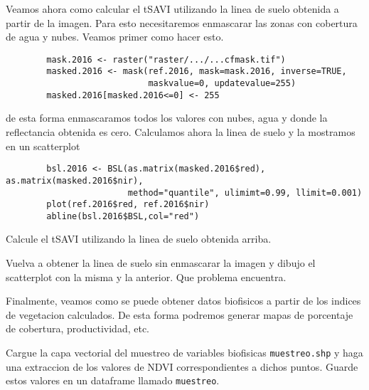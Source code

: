 \documentclass[a4paper]{article}
\begin{document}
\begin{exa}
    Veamos ahora como calcular el tSAVI utilizando la linea de suelo obtenida a
    partir de la imagen. Para esto necesitaremos enmascarar las zonas con
    cobertura de agua y nubes. Veamos primer como hacer esto.
    \begin{lstlisting}
        mask.2016 <- raster("raster/.../...cfmask.tif")
        masked.2016 <- mask(ref.2016, mask=mask.2016, inverse=TRUE,
                            maskvalue=0, updatevalue=255)
        masked.2016[masked.2016<=0] <- 255
    \end{lstlisting}
    de esta forma enmascaramos todos los valores con nubes, agua y donde la
    reflectancia obtenida es cero.
    Calculamos ahora la linea de suelo y la mostramos en un scatterplot
    \begin{lstlisting}
        bsl.2016 <- BSL(as.matrix(masked.2016$red), as.matrix(masked.2016$nir),
                        method="quantile", ulimimt=0.99, llimit=0.001)
        plot(ref.2016$red, ref.2016$nir)
        abline(bsl.2016$BSL,col="red")
    \end{lstlisting}
\end{exa}

\begin{act}
    Calcule el tSAVI utilizando la linea de suelo obtenida arriba.
\end{act}

\begin{act}
    Vuelva a obtener la linea de suelo sin enmascarar la imagen y dibujo el
    scatterplot con la misma y la anterior. Que problema encuentra.
\end{act}

Finalmente, veamos como se puede obtener datos biofisicos a partir de los
indices de vegetacion calculados. De esta forma podremos generar mapas de
porcentaje de cobertura, productividad, etc.

\begin{act}
    Cargue la capa vectorial del muestreo de variables biofisicas
    \texttt{muestreo.shp} y haga una extraccion de los valores de NDVI
    correspondientes a dichos puntos. Guarde estos valores en un dataframe
    llamado \texttt{muestreo}.
\end{act}
\end{document}
